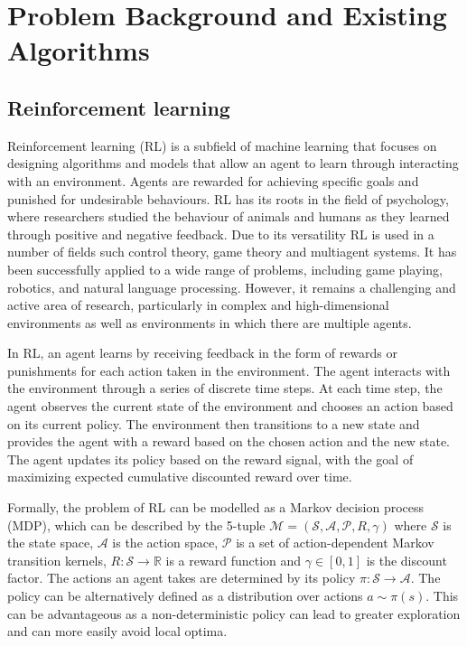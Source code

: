 \chapter{Problem Background and Existing Algorithms}

\section{Reinforcement learning}
\label{sec:RL}
Reinforcement learning (RL) is a subfield of machine learning that focuses on designing algorithms and models that allow an agent to learn through interacting with an environment. Agents are rewarded for achieving specific goals and punished for undesirable behaviours. RL has its roots in the field of psychology, where researchers studied the behaviour of animals and humans as they learned through positive and negative feedback. Due to its versatility RL is used in a number of fields such control theory, game theory and multiagent systems. It has been successfully applied to a wide range of problems, including game playing, robotics, and natural language processing. However, it remains a challenging and active area of research, particularly in complex and high-dimensional environments as well as environments in which there are multiple agents. 

In RL, an agent learns by receiving feedback in the form of rewards or punishments for each action taken in the environment. The agent interacts with the environment through a series of discrete time steps. At each time step, the agent observes the current state of the environment and chooses an action based on its current policy. The environment then transitions to a new state and provides the agent with a reward based on the chosen action and the new state. The agent updates its policy based on the reward signal, with the goal of maximizing expected cumulative discounted reward over time.

Formally, the problem of RL can be modelled as a Markov decision process (MDP), which can be described by the 5-tuple $\mathcal{M} = (\mathcal{S}, \mathcal{A}, \mathcal{P}, R,\gamma)$ where $\mathcal{S}$ is the state space, $\mathcal{A}$ is the action space, $\mathcal{P}$ is a set of action-dependent Markov transition kernels, $R: \mathcal{S} \rightarrow \mathbb{R}$ is a reward function and $\gamma \in [0,1]$ is the discount factor.
The actions an agent takes are determined by its policy $\pi: \mathcal{S} \rightarrow \mathcal{A}$. The policy can be alternatively defined as a distribution over actions $a \sim \pi(s)$. This can be advantageous as a non-deterministic policy can lead to greater exploration and can more easily avoid local optima. 

